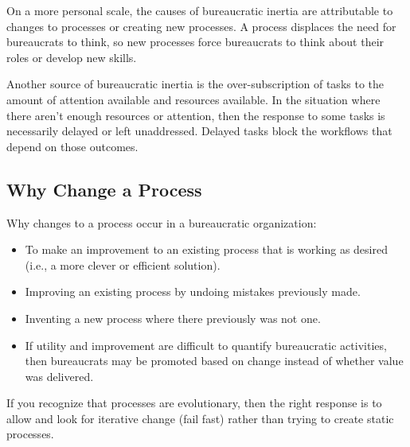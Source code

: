 On a more personal scale, the causes of bureaucratic inertia are attributable to changes to processes or creating new processes. A process displaces the need for bureaucrats to think, so new processes force bureaucrats to think about their roles or develop new skills. 



Another source of bureaucratic inertia is the over-subscription of tasks to the amount of attention available and resources available. In the situation where there aren't enough resources or attention, then the response to some tasks is necessarily delayed or left unaddressed. Delayed tasks block the workflows that depend on those outcomes. 





\subsection*{Why Change a Process}
Why changes to a process occur in a bureaucratic organization:
\begin{itemize}
    \item To make an improvement to an existing process that is working as desired (i.e., a more clever or efficient solution).
    \item Improving an existing process by undoing mistakes previously made.
    \item Inventing a new process where there previously was not one.
    \item If utility and improvement are difficult to quantify bureaucratic activities, then bureaucrats may be promoted based on change instead of whether value was delivered.
\end{itemize}

If you recognize that processes are evolutionary, then the right response is to allow and look for iterative change (fail fast) rather than trying to create static processes.

